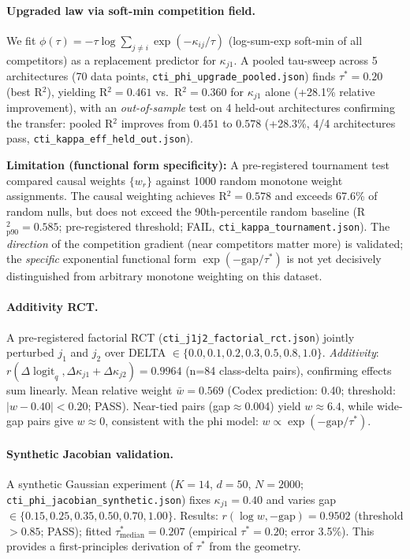\documentclass{article}
\DeclareMathOperator{\logit}{logit}
\begin{document}
\paragraph{Upgraded law via soft-min competition field.}
We fit $\phi(\tau)=-\tau\log\sum_{j\neq i}\exp(-\kappa_{ij}/\tau)$ (log-sum-exp soft-min of all
competitors) as a replacement predictor for $\kappa_{j1}$.
A pooled tau-sweep across 5 architectures (70 data points, \texttt{cti\_phi\_upgrade\_pooled.json})
finds $\tau^*=0.20$ (best R$^2$), yielding R$^2=0.461$ vs.\ R$^2=0.360$ for $\kappa_{j1}$
alone (+28.1\% relative improvement), with an \emph{out-of-sample} test on 4 held-out
architectures confirming the transfer: pooled R$^2$ improves from $0.451$ to $0.578$
(+28.3\%, 4/4 architectures pass, \texttt{cti\_kappa\_eff\_held\_out.json}).

\textbf{Limitation (functional form specificity):} A pre-registered tournament test compared
causal weights $\{w_r\}$ against 1000 random monotone weight assignments. The causal weighting
achieves R$^2=0.578$ and exceeds 67.6\% of random nulls, but does not exceed the 90th-percentile
random baseline (R$^2_{\mathrm{p90}}=0.585$; pre-registered threshold; FAIL,
\texttt{cti\_kappa\_tournament.json}). The \emph{direction} of the competition gradient
(near competitors matter more) is validated; the \emph{specific} exponential functional form
$\exp(-\mathrm{gap}/\tau^*)$ is not yet decisively distinguished from arbitrary monotone
weighting on this dataset.

\paragraph{Additivity RCT.}
A pre-registered factorial RCT (\texttt{cti\_j1j2\_factorial\_rct.json}) jointly perturbed
$j_1$ and $j_2$ over DELTA $\in\{0.0,0.1,0.2,0.3,0.5,0.8,1.0\}$.
\emph{Additivity}: $r(\Delta\logit_q,\Delta\kappa_{j1}+\Delta\kappa_{j2})=0.9964$ (n=84
class-delta pairs), confirming effects sum linearly.
Mean relative weight $\bar{w}=0.569$ (Codex prediction: 0.40; threshold: $|w-0.40|<0.20$; PASS).
Near-tied pairs (gap$\approx$0.004) yield $w\approx6.4$, while wide-gap pairs give $w\approx0$,
consistent with the phi model: $w\propto\exp(-\mathrm{gap}/\tau^*)$.

\paragraph{Synthetic Jacobian validation.}
A synthetic Gaussian experiment ($K=14$, $d=50$, $N=2000$; \texttt{cti\_phi\_jacobian\_synthetic.json})
fixes $\kappa_{j1}=0.40$ and varies gap $\in\{0.15,0.25,0.35,0.50,0.70,1.00\}$.
Results: $r(\log w,-\mathrm{gap})=0.9502$ (threshold $>0.85$; PASS);
fitted $\tau^*_{\mathrm{median}}=0.207$ (empirical $\tau^*=0.20$; error 3.5\%).
This provides a first-principles derivation of $\tau^*$ from the geometry.
\end{document}
